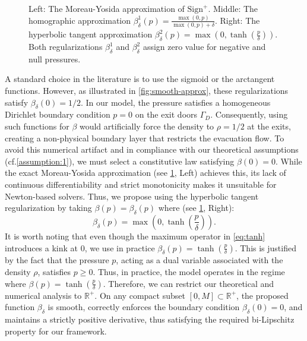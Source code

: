 \documentclass[final,reqno]{amsart}
\theoremstyle{plain}
\theoremstyle{definition}
\theoremstyle{remark}
\numberwithin{remark}{section}	%
\numberwithin{example}{section}	%
\newcommand{\cf}{cf.\xspace}	%
\begin{document}
\begin{figure}[htbp]
    
    \caption{Left: The Moreau-Yosida approximation of $\text{Sign}^+$. Middle: The homographic approximation $\beta^{1}_{\delta}(p) = \frac{\max(0,p)}{\max(0,p)+\delta}$. Right: The hyperbolic tangent approximation $\beta^{2}_{\delta}(p) = \max\left(0, \tanh\left(\frac{p}{\delta}\right)\right)$. Both regularizations $\beta^1_\delta$ and $\beta^2_\delta$ assign zero value for negative and null pressures.}
    \label{fig:tanh-approx}
\end{figure}

A standard choice in the literature is to use the sigmoid or the arctangent functions. However, as illustrated in \cref{fig:smooth-approx}, these regularizations satisfy $\beta_\delta(0) = 1/2$. In our model, the pressure satisfies a homogeneous Dirichlet boundary condition $p=0$ on the exit doors $\Gamma_D$. Consequently, using such functions for $\beta$ would artificially force the density to $\rho = 1/2$ at the exits, creating a non-physical boundary layer that restricts the evacuation flow. To avoid this numerical artifact and in compliance with our theoretical assumptions (\cf  \cref{assumption:1}), we must select a constitutive law satisfying $\beta(0) = 0$. 
While the exact Moreau-Yosida approximation (see \cref{fig:tanh-approx}, Left) achieves this, its lack of continuous differentiability and strict monotonicity makes it unsuitable for Newton-based solvers. Thus, we propose using the hyperbolic tangent regularization by taking $\beta(p) = \beta_{\delta}(p)$ where (see \cref{fig:tanh-approx}, Right):
\begin{equation}\label{eq:tanh}
    \beta_\delta(p) = \max\left(0,\tanh\left(\frac{p}{\delta}\right)\right).
\end{equation}
It is worth noting that even though the maximum operator in \eqref{eq:tanh} introduces a kink at $0$, we use in practice $\beta_\delta(p) = \tanh\left(\frac{p}{\delta}\right)$. This is justified by the fact that the pressure $p$, acting as a dual variable associated with the density $\rho$, satisfies $p\geq 0$. Thus, in practice, the model operates in the regime where $\beta(p) = \tanh\left(\frac{p}{\delta}\right)$. Therefore, we can restrict our theoretical and numerical analysis to $\mathbb{R}^+$. On any compact subset $[0, M] \subset \mathbb{R}^+$, the proposed function $\beta_\delta$ is smooth, correctly enforces the boundary condition $\beta_\delta(0)=0$, and maintains a strictly positive derivative, thus satisfying the required bi-Lipschitz property for our framework.
\end{document}
